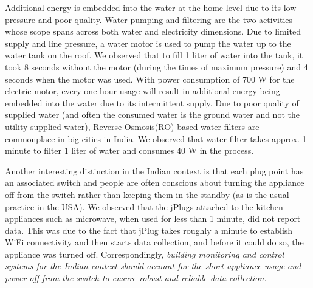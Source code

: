 \documentclass[10pt]{sensys-proc}
\newcommand{\redcolor}[1]{\textcolor{red}{#1}}
\begin{document}
\noindent Additional energy is embedded into the water at the home level due to its low pressure and poor quality. Water pumping and filtering are the two activities whose scope spans across both water and electricity dimensions. Due to limited supply and line pressure, a water motor is used to pump the water up to the water tank on the roof. We observed that to fill 1 liter of water into the tank, it took 8 seconds without the motor (during the times of maximum pressure) and 4 seconds when the motor was used. With power consumption of 700 W for the electric motor, every one hour usage will result in additional energy being embedded into the water due to its intermittent supply. %
Due to poor quality of supplied water (and often the consumed water is the ground water and not the utility supplied water), Reverse Osmosis(RO) based water filters are commonplace in big cities in India. We observed that water filter takes approx. 1 minute to filter 1 liter of water and consumes 40 W in the process. 

\noindent Another interesting distinction in the Indian context is that each plug point has an associated switch and people are often conscious about turning the appliance off from the switch rather than keeping them in the standby (as is the usual practice in the USA). We observed that the jPlugs attached to the kitchen appliances such as microwave, when used for less than 1 minute, did not report data. This was due to the fact that jPlug takes roughly a minute to establish WiFi connectivity and then starts data collection, and before it could do so, the appliance was turned off.
Correspondingly, \emph{building monitoring and control systems for the Indian context should account for the short appliance usage and power off from the switch to ensure robust and reliable data collection.}
\end{document}
